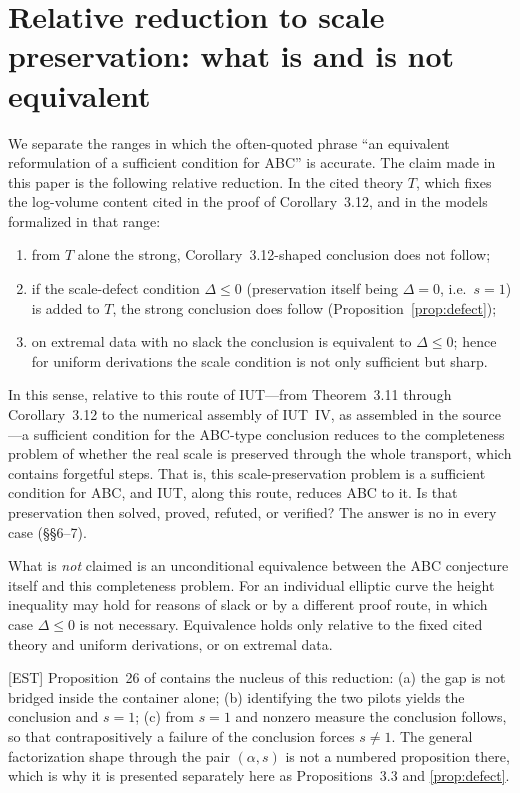\documentclass[11pt]{article}
\theoremstyle{plain}
\theoremstyle{definition}
\theoremstyle{remark}
\newcommand{\EST}{\textup{[EST]}}
\begin{document}
\section{Relative reduction to scale preservation: what is and is
not equivalent}

We separate the ranges in which the often-quoted phrase ``an
equivalent reformulation of a sufficient condition for ABC'' is
accurate.  The claim made in this paper is the following relative
reduction.  In the cited theory $T$, which fixes the log-volume
content cited in the proof of Corollary~3.12, and in the models
formalized in that range:
\begin{enumerate}[label=\textup{(\arabic*)}]
\item from $T$ alone the strong, Corollary~3.12-shaped conclusion
does not follow;
\item if the scale-defect condition $\Delta\le0$ (preservation
itself being $\Delta=0$, i.e.\ $s=1$) is added to $T$, the strong
conclusion does follow (Proposition~\ref{prop:defect});
\item on extremal data with no slack the conclusion is equivalent
to $\Delta\le0$; hence for uniform derivations the scale condition
is not only sufficient but sharp.
\end{enumerate}
In this sense, relative to this route of IUT---from Theorem~3.11
through Corollary~3.12 to the numerical assembly of IUT~IV, as
assembled in the source---a sufficient condition for the ABC-type
conclusion reduces to the completeness problem of whether the real
scale is preserved through the whole transport, which contains
forgetful steps.  That is, this scale-preservation problem is a
sufficient condition for ABC, and IUT, along this route, reduces ABC
to it.  Is that preservation then solved, proved, refuted, or
verified?  The answer is no in every case (\S\S6--7).

What is \emph{not} claimed is an unconditional equivalence between
the ABC conjecture itself and this completeness problem.  For an
individual elliptic curve the height inequality may hold for reasons
of slack or by a different proof route, in which case $\Delta\le0$
is not necessary.  Equivalence holds only relative to the fixed
cited theory and uniform derivations, or on extremal data.

\EST{} Proposition~26 of \cite{U26} contains the nucleus of this
reduction: (a) the gap is not bridged inside the container alone;
(b) identifying the two pilots yields the conclusion and $s=1$;
(c) from $s=1$ and nonzero measure the conclusion follows, so that
contrapositively a failure of the conclusion forces $s\ne1$.  The
general factorization shape through the pair $(\alpha,s)$ is not a
numbered proposition there, which is why it is presented separately
here as Propositions~3.3 and \ref{prop:defect}.
\end{document}
